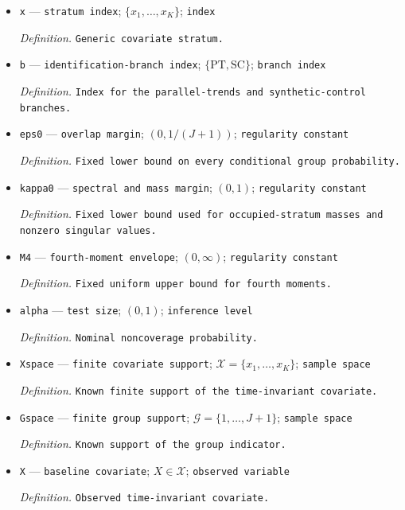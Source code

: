 \documentclass{article}
\begin{document}
\begin{itemize}
  \item \texttt{x} --- \texttt{stratum index}; \(\{x_1,\ldots,x_K\}\); \texttt{index}
  \par\smallskip\noindent\emph{Definition.} \texttt{Generic covariate stratum.}
  \item \texttt{b} --- \texttt{identification-\allowbreak{}branch index}; \(\{\mathrm{PT},\mathrm{SC}\}\); \texttt{branch index}
  \par\smallskip\noindent\emph{Definition.} \texttt{Index for the parallel-\allowbreak{}trends and synthetic-\allowbreak{}control branches.}
  \item \texttt{eps0} --- \texttt{overlap margin}; \((0,1/(J+1))\); \texttt{regularity constant}
  \par\smallskip\noindent\emph{Definition.} \texttt{Fixed lower bound on every conditional group probability.}
  \item \texttt{kappa0} --- \texttt{spectral and mass margin}; \((0,1)\); \texttt{regularity constant}
  \par\smallskip\noindent\emph{Definition.} \texttt{Fixed lower bound used for occupied-\allowbreak{}stratum masses and nonzero singular values.}
  \item \texttt{M4} --- \texttt{fourth-\allowbreak{}moment envelope}; \((0,\infty)\); \texttt{regularity constant}
  \par\smallskip\noindent\emph{Definition.} \texttt{Fixed uniform upper bound for fourth moments.}
  \item \texttt{alpha} --- \texttt{test size}; \((0,1)\); \texttt{inference level}
  \par\smallskip\noindent\emph{Definition.} \texttt{Nominal noncoverage probability.}
  \item \texttt{Xspace} --- \texttt{finite covariate support}; \(\mathcal X=\{x_1,\ldots,x_K\}\); \texttt{sample space}
  \par\smallskip\noindent\emph{Definition.} \texttt{Known finite support of the time-\allowbreak{}invariant covariate.}
  \item \texttt{Gspace} --- \texttt{finite group support}; \(\mathcal G=\{1,\ldots,J+1\}\); \texttt{sample space}
  \par\smallskip\noindent\emph{Definition.} \texttt{Known support of the group indicator.}
  \item \texttt{X} --- \texttt{baseline covariate}; \(X\in\mathcal X\); \texttt{observed variable}
  \par\smallskip\noindent\emph{Definition.} \texttt{Observed time-\allowbreak{}invariant covariate.}

\end{itemize}
\end{document}
